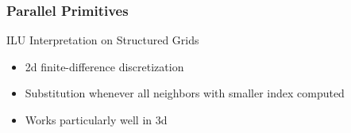\begin{frame}[fragile]
\frametitle{Parallel Primitives}

     \begin{block}{ILU Interpretation on Structured Grids}
      \begin{itemize}
        \item 2d finite-difference discretization
        \item Substitution whenever all neighbors with smaller index computed
        \item Works particularly well in 3d
      \end{itemize}

      \begin{center}
%

\end{center}
\end{block}
\end{frame}
